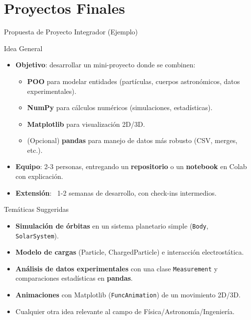\documentclass[10pt]{beamer}
\begin{document}
\section{Proyectos Finales}

\begin{frame}{Propuesta de Proyecto Integrador (Ejemplo)}
  \begin{block}{Idea General}
    \begin{itemize}
      \item \textbf{Objetivo}: desarrollar un mini-proyecto donde se combinen:
        \begin{itemize}
          \item \textbf{POO} para modelar entidades (partículas, cuerpos astronómicos, datos experimentales).
          \item \textbf{NumPy} para cálculos numéricos (simulaciones, estadísticas).
          \item \textbf{Matplotlib} para visualización 2D/3D.
          \item (Opcional) \textbf{pandas} para manejo de datos más robusto (CSV, merges, etc.).
        \end{itemize}
      \item \textbf{Equipo}: 2-3 personas, entregando un \textbf{repositorio} o un \textbf{notebook} en Colab con explicación.
      \item \textbf{Extensión}: ~1-2 semanas de desarrollo, con check-ins intermedios.
    \end{itemize}
  \end{block}
\end{frame}

\begin{frame}{Temáticas Suggeridas}
  \begin{itemize}
    \item \textbf{Simulación de órbitas} en un sistema planetario simple (\texttt{Body}, \texttt{SolarSystem}).
    \item \textbf{Modelo de cargas} (Particle, ChargedParticle) e interacción electrostática.
    \item \textbf{Análisis de datos experimentales} con una clase \texttt{Measurement} y comparaciones estadísticas en \textbf{pandas}.
    \item \textbf{Animaciones} con Matplotlib (\texttt{FuncAnimation}) de un movimiento 2D/3D.
    \item Cualquier otra idea relevante al campo de Física/Astronomía/Ingeniería.
  \end{itemize}
\end{frame}
\end{document}
